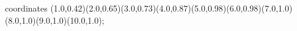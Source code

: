 					coordinates { (1.0,0.42)(2.0,0.65)(3.0,0.73)(4.0,0.87)(5.0,0.98)(6.0,0.98)(7.0,1.0)(8.0,1.0)(9.0,1.0)(10.0,1.0)};